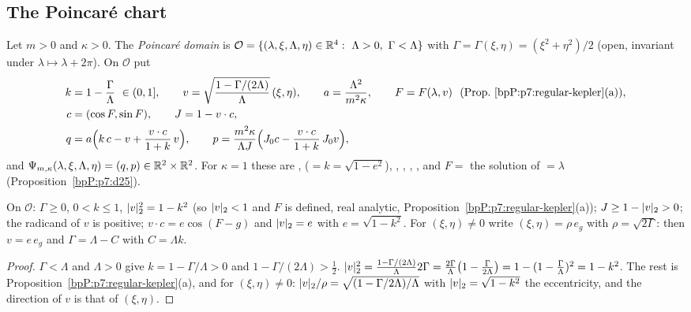 \subsection{The Poincar\'e chart}\label{bpP:p7:sec-poincare}

\begin{definition}\label{bpP:p7:poincare-def}
Let $m>0$ and $\kappa>0$. The \emph{Poincar\'e domain} is $\mathcal O=\{(\lambda,\xi,\Lambda,\eta)\in\R^4:\ \Lambda>0,\ \Gamma<\Lambda\}$ with $\Gamma=\Gamma(\xi,\eta)=(\xi^2+\eta^2)/2$ (open, invariant under $\lambda\mapsto\lambda+2\pi$). On $\mathcal O$ put
\begin{align*}
k&=1-\frac\Gamma\Lambda\ \in(0,1],\qquad v=\sqrt{\frac{1-\Gamma/(2\Lambda)}{\Lambda}}\,(\xi,\eta),\qquad a=\frac{\Lambda^2}{m^2\kappa},\qquad F=F(\lambda,v)\ \ \text{(Prop.~\ref{bpP:p7:regular-kepler}(a))},\\
c&=(\cos F,\sin F),\qquad J=1-v\cdot c,\\
q&=a\Bigl(k\,c-v+\frac{v\cdot c}{1+k}\,v\Bigr),\qquad p=\frac{m^2\kappa}{\Lambda J}\Bigl(J_0c-\frac{v\cdot c}{1+k}\,J_0v\Bigr),
\end{align*}
and $\Psi_{m,\kappa}(\lambda,\xi,\Lambda,\eta)=(q,p)\in\mathbb{R}^2\times\mathbb{R}^2$. For $\kappa=1$ these are ,  ($=k=\sqrt{1-e^2}$), , , , , and $F=$ the solution of ${}=\lambda$ (Proposition~\ref{bpP:p7:d25}).
\end{definition}

\begin{lemma}\label{bpP:p7:o-facts}
On $\mathcal O$: $\Gamma\ge0$, $0<k\le1$, $\lvert v\rvert_2^2=1-k^2$ (so $\lvert v\rvert_2<1$ and $F$ is defined, real analytic, Proposition~\ref{bpP:p7:regular-kepler}(a)); $J\ge1-\lvert v\rvert_2>0$; the radicand of $v$ is positive; $v\cdot c=e\cos(F-g)$ and $\lvert v\rvert_2=e$ with $e=\sqrt{1-k^2}$. For $(\xi,\eta)\ne0$ write $(\xi,\eta)=\rho\,e_g$ with $\rho=\sqrt{2\Gamma}$: then $v=e\,e_g$ and $\Gamma=\Lambda-C$ with $C=\Lambda k$.
\end{lemma}
\begin{proof}
$\Gamma<\Lambda$ and $\Lambda>0$ give $k=1-\Gamma/\Lambda>0$ and $1-\Gamma/(2\Lambda)>\frac12$. $\lvert v\rvert_2^2=\frac{1-\Gamma/(2\Lambda)}{\Lambda}2\Gamma=\frac{2\Gamma}\Lambda\bigl(1-\frac\Gamma{2\Lambda}\bigr)=1-(1-\frac\Gamma\Lambda)^2=1-k^2$. The rest is Proposition~\ref{bpP:p7:regular-kepler}(a), and for $(\xi,\eta)\ne0$: $\lvert v\rvert_2/\rho=\sqrt{(1-\Gamma/2\Lambda)/\Lambda}$ with $\lvert v\rvert_2=\sqrt{1-k^2}$ the eccentricity, and the direction of $v$ is that of $(\xi,\eta)$.
\end{proof}

